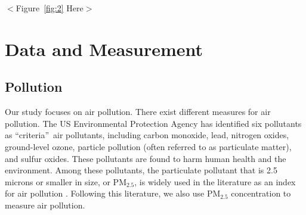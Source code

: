 \documentclass[12pt]{article}
\begin{document}

\begin{center}
$<$Figure~\ref{fig:2} Here$>$
\end{center}

\section{Data and Measurement}

\label{sec:3}

\subsection{Pollution}

\label{sec:3.1} Our study focuses on air pollution. There exist different
measures for air pollution. The US Environmental Protection Agency has
identified six pollutants as \textquotedblleft criteria\textquotedblright\
air pollutants, including carbon monoxide, lead, nitrogen oxides,
ground-level ozone, particle pollution (often referred to as particulate
matter), and sulfur oxides. These pollutants are found to harm human health
and the environment. Among these pollutants, the particulate pollutant that
is 2.5 microns or smaller in size, or $\mathrm{PM_{2.5}}$, is widely used in
the literature as an index for air pollution %
\citep{fu2021air,khanna2021productivity}. Following this literature, we also
use $\mathrm{PM_{2.5}}$ concentration to measure air pollution.
\end{document}
